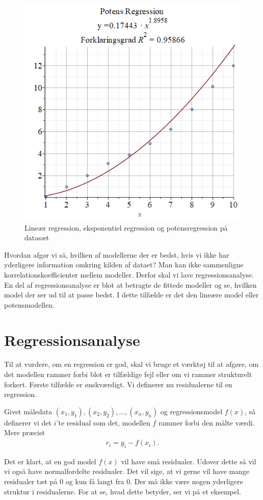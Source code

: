 \begin{exa}
\begin{figure}[H]
\includegraphics[width = \textwidth*4/10]{Billeder/powreg.png}
\caption{Lineær regression, eksponentiel regression og potensregression på datasæt}
\label{fig:regression}
\end{figure}
Hvordan afgør vi så, hvilken af modellerne der er bedst, hvis vi ikke har yderligere information omkring kilden af dataet? Man kan ikke sammenligne korrelationskoefficienter mellem modeller. Derfor skal vi lave regressionsanalyse. En del af regressionsanalyse er blot at betragte de fittede modeller og se, hvilken model der ser ud til at passe bedst. I dette tilfælde er det den lineære model eller potensmodellen. 
\end{exa}


\section*{Regressionsanalyse}

Til at vurdere, om en regression er god, skal vi bruge et værktøj til at afgøre, om det modellen rammer forbi blot er tilfældige fejl eller om vi rammer strukturelt forkert. Første tilfælde er ønskværdigt. Vi definerer nu residualerne til en regression.
\begin{defn}
Givet måledata $(x_1,y_1),(x_2,y_2),\hdots,(x_n,y_n)$ og regressionsmodel $f(x)$, så definerer vi det $i$'te residual som det, modellen $f$ rammer forbi den målte værdi. Mere præcist
\begin{align*}
r_i = y_i - f(x_i).
\end{align*} 
\end{defn}
Det er klart, at en god model $f(x)$ vil have små residualer. Udover dette så vil vi også have normalfordelte residualer. Det vil sige, at vi gerne vil have mange residualer tæt på 0 og kun få langt fra 0. Der må ikke være nogen yderligere struktur i residualerne. For at se, hvad dette betyder, ser vi på et eksempel.

